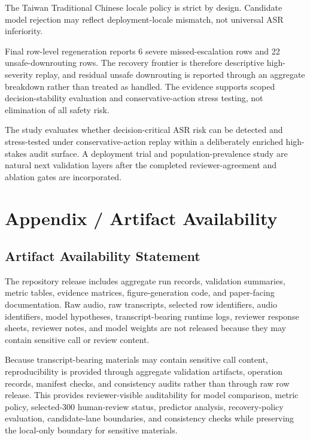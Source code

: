 \documentclass[
]{article}
\begin{document}
The Taiwan Traditional Chinese locale policy is strict by design.
Candidate model rejection may reflect deployment-locale mismatch, not
universal ASR inferiority.

Final row-level regeneration reports 6 severe missed-escalation rows and
22 unsafe-downrouting rows. The recovery frontier is therefore
descriptive high-severity replay, and residual unsafe downrouting is
reported through an aggregate breakdown rather than treated as handled.
The evidence supports scoped decision-stability evaluation and
conservative-action stress testing, not elimination of all safety risk.

The study evaluates whether decision-critical ASR risk can be detected
and stress-tested under conservative-action replay within a deliberately
enriched high-stakes audit surface.
A deployment trial and population-prevalence study are natural next
validation layers after the completed reviewer-agreement and ablation
gates are incorporated.

\hypertarget{appendix-artifact-availability}{%
\section{Appendix / Artifact
Availability}\label{appendix-artifact-availability}}

\hypertarget{artifact-availability-statement}{%
\subsection{Artifact Availability
Statement}\label{artifact-availability-statement}}

The repository release includes aggregate run records, validation
summaries, metric tables, evidence matrices, figure-generation code, and
paper-facing documentation. Raw audio, raw transcripts, selected row
identifiers, audio identifiers, model hypotheses, transcript-bearing
runtime logs, reviewer response sheets, reviewer notes, and model
weights are not released because they may contain sensitive call or
review content.

Because transcript-bearing materials may contain sensitive call content,
reproducibility is provided through aggregate validation artifacts,
operation records, manifest checks, and consistency audits rather than
through raw row release. This provides reviewer-visible auditability for
model comparison, metric policy, selected-300 human-review status,
predictor analysis, recovery-policy evaluation, candidate-lane
boundaries, and consistency checks while preserving the local-only
boundary for sensitive materials.
\end{document}
